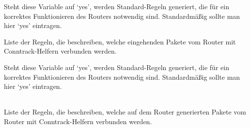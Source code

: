 \begin{description}

Steht diese Variable auf `yes', werden Standard-Regeln generiert, die
für ein korrektes Funktionieren des Routers notwendig
sind. Standardmäßig sollte man hier `yes' eintragen.

Liste der Regeln, die beschreiben, welche eingehenden Pakete vom Router mit
Conntrack-Helfern verbunden werden.

Steht diese Variable auf `yes', werden Standard-Regeln generiert, die
für ein korrektes Funktionieren des Routers notwendig
sind. Standardmäßig sollte man hier `yes' eintragen.

\mbox{}\\
Liste der Regeln, die beschreiben, welche auf dem Router generierten Pakete vom
Router mit Conntrack-Helfern verbunden werden.

\end{description}

